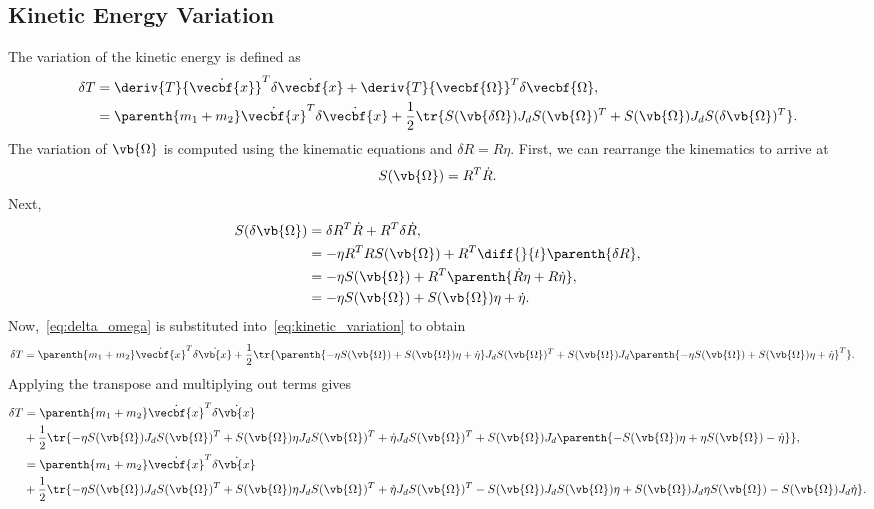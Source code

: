 \documentclass[11pt, reqno]{article}    %
\begin{document}
\subsection{Kinetic Energy Variation}
The variation of the kinetic energy is defined as
\begin{align}\label{eq:kinetic_variation}
    \delta T &= \deriv{T}{\dot{\vecbf{x}}}^T \delta \dot{\vecbf{x}} + \deriv{T}{\vecbf{\Omega}}^T \delta \vecbf{\Omega} , \\
    &=   \parenth{m_1 + m_2} \dot{\vecbf{x}}^T \delta \dot{\vecbf{x}} + \frac{1}{2} \tr{ S(\vb{\delta \Omega}) J_d S(\vb{\Omega})^T + S(\vb{\Omega}) J_d S(\delta \vb{\Omega})^T}.
\end{align}
The variation of \( \vb{\Omega} \) is computed using the kinematic equations and \( \delta R = R \eta\).
First, we can rearrange the kinematics to arrive at
\begin{align*}
    S(\vb{\Omega}) = R^T \dot{R}.
\end{align*}
Next,
\begin{align}\label{eq:delta_omega}
    S(\delta \vb{\Omega}) &= \delta R^T \dot{R} + R^T \delta \dot{R} , \nonumber \\
    &= - \eta R^T R S(\vb{\Omega}) + R^T \diff{}{t} \parenth{\delta R}, \nonumber\\
    &= -\eta S(\vb{\Omega}) + R^T \parenth{\dot{R}\eta + R \dot{\eta}}, \nonumber \\
    &= -\eta S(\vb{\Omega}) + S(\vb{\Omega}) \eta + \dot{\eta}  . 
\end{align}
Now,~\cref{eq:delta_omega} is substituted into~\cref{eq:kinetic_variation} to obtain
\begin{align*}
    \delta T &=  \parenth{m_1 + m_2} \dot{\vecbf{x}}^T \delta \dot{\vb{x}} + \frac{1}{2} \tr{\parenth{-\eta S(\vb{\Omega}) + S(\vb{\Omega}) \eta + \dot{\eta}} J_d S(\vb{\Omega})^T + S(\vb{\Omega}) J_d \parenth{-\eta S(\vb{\Omega}) + S(\vb{\Omega}) \eta + \dot{\eta}}^T} .
\end{align*}
Applying the transpose and multiplying out terms gives
\begin{align*}
    \delta T &=  \parenth{m_1 + m_2} \dot{\vecbf{x}}^T \delta \dot{\vb{x}} \\
    &+ \frac{1}{2} \tr{ -\eta S(\vb{\Omega}) J_d S(\vb{\Omega})^T + S(\vb{\Omega})\eta J_d S(\vb{\Omega})^T + \dot{\eta}J_d S(\vb{\Omega})^T + S(\vb{\Omega}) J_d \parenth{-S(\vb{\Omega}) \eta + \eta S(\vb{\Omega}) - \dot{\eta}}} , \\
    &=  \parenth{m_1 + m_2} \dot{\vecbf{x}}^T \delta \dot{\vb{x}} \\
    &+ \frac{1}{2} \tr{-\eta S(\vb{\Omega}) J_d S(\vb{\Omega})^T + S(\vb{\Omega})\eta J_d S(\vb{\Omega})^T + \dot{\eta}J_d S(\vb{\Omega})^T -S(\vb{\Omega}) J_d S(\vb{\Omega}) \eta + S(\vb{\Omega}) J_d \eta S(\vb{\Omega}) - S(\vb{\Omega}) J_d \dot{\eta} } .
\end{align*}
\end{document}
